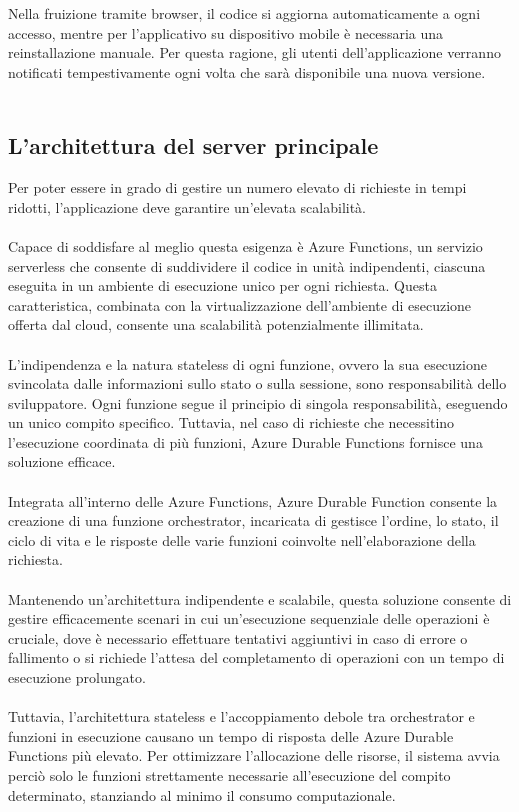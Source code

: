 Nella fruizione tramite browser, il codice si aggiorna automaticamente a ogni accesso, mentre per l’applicativo su dispositivo mobile è necessaria una reinstallazione manuale.
Per questa ragione, gli utenti dell’applicazione verranno notificati tempestivamente ogni volta che sarà disponibile una nuova versione.\\
\\
\clearpage
\subsection{L’architettura del server principale}

Per poter essere in grado di gestire un numero elevato di richieste in tempi ridotti, l’applicazione deve garantire un’elevata scalabilità.\\
\\
Capace di soddisfare al meglio questa esigenza è Azure Functions, un servizio serverless che consente di suddividere il codice in unità indipendenti,
ciascuna eseguita in un ambiente di esecuzione unico per ogni richiesta.
Questa caratteristica, combinata con la virtualizzazione dell’ambiente di esecuzione offerta dal cloud, consente una scalabilità potenzialmente illimitata.\\
\\
L’indipendenza e la natura stateless di ogni funzione, ovvero la sua esecuzione svincolata dalle informazioni sullo stato o sulla sessione, sono responsabilità dello sviluppatore.
Ogni funzione segue il principio di singola responsabilità, eseguendo un unico compito specifico.
Tuttavia, nel caso di richieste che necessitino l’esecuzione coordinata di più funzioni, Azure Durable Functions fornisce una soluzione efficace.\\
\\
Integrata all’interno delle Azure Functions, Azure Durable Function consente la creazione di una funzione orchestrator,
incaricata di gestisce l’ordine, lo stato, il ciclo di vita e le risposte delle varie funzioni coinvolte nell’elaborazione della richiesta.\\
\\
Mantenendo un'architettura indipendente e scalabile, questa soluzione consente di gestire efficacemente scenari in cui un’esecuzione sequenziale delle operazioni è cruciale,
dove è necessario effettuare tentativi aggiuntivi in caso di errore o fallimento o si richiede l'attesa del completamento di operazioni con un tempo di esecuzione prolungato.\\
\\
Tuttavia, l'architettura stateless e l’accoppiamento debole tra orchestrator e funzioni in esecuzione causano un tempo di risposta delle Azure Durable Functions più elevato.
Per ottimizzare l’allocazione delle risorse, il sistema avvia perciò solo le funzioni strettamente necessarie all’esecuzione del compito determinato,
stanziando al minimo il consumo computazionale.\\
\\

